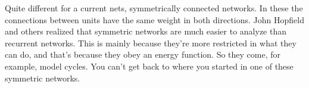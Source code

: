 \begin{multicols}{2}
\begin{footnotesize}
Quite different for a current nets, symmetrically connected networks.
In these the connections between units have the same weight in both directions. John Hopfield and others realized that symmetric networks are much easier to analyze than recurrent networks. This is mainly because they're more restricted in what they can do, and that's because they obey an energy function. So they come, for example, model cycles. You can't get back to where you started in one of these symmetric networks. 
\end{footnotesize}
\end{multicols}

